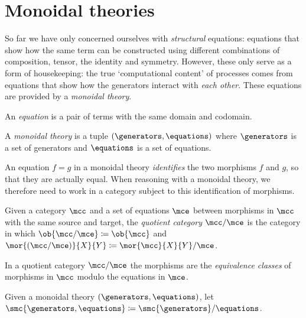 \section{Monoidal theories}\label{sec:monoidal-theories}

So far we have only concerned ourselves with \emph{structural} equations:
equations that show how the same term can be constructed using different
combinations of composition, tensor, the identity and symmetry.
However, these only serve as a form of housekeeping: the true `computational
content' of processes comes from equations that show how the generators interact
with \emph{each other}.
These equations are provided by a \emph{monoidal theory}.

\begin{definition}
    An \emph{equation} is a pair of terms with the same domain and
    codomain.
\end{definition}

\begin{definition}
    A \emph{monoidal theory} is a tuple \((\generators, \equations)\) where
    \(\generators\) is a set of generators and \(\equations\) is a set of
    equations.
\end{definition}

An equation \(f = g\) in a monoidal theory \emph{identifies} the two morphisms
\(f\) and \(g\), so that they are actually equal.
When reasoning with a monoidal theory, we therefore need to work in a category
subject to this identification of morphisms.

\begin{definition}
    Given a category \(\mcc\) and a set of equations \(\mce\) between
    morphisms in \(\mcc\) with the same source and target, the
    \emph{quotient category} \(\mcc / \mce\) is the category in which
    \(\ob{\mcc / \mce} \coloneqq \ob{\mcc}\) and \(
    \mor{(\mcc / \mce)}{X}{Y}
    \coloneqq
    \mor{\mcc}{X}{Y} / \mce
    \).
\end{definition}

In a quotient category \(\mcc / \mce\) the morphisms are the
\emph{equivalence classes} of morphisms in \(\mcc\) modulo the equations in
\(\mce\).

\begin{definition}
    Given a monoidal theory \((\generators, \equations)\), let
    \(\smc{\generators, \equations} \coloneqq \smc{\generators} / \equations\).
\end{definition}

